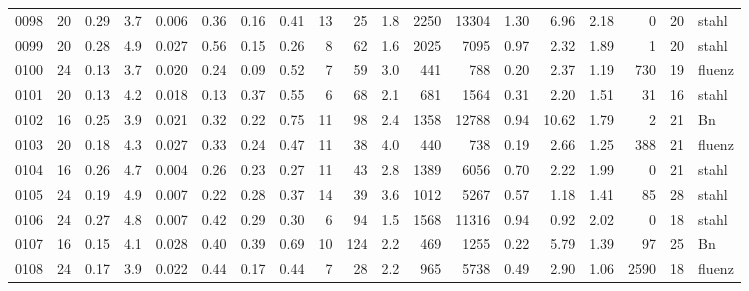 {\begin{longtable}{@{}lrrrrrrrrrrrrrrrrrl@{}}
0098 & 20 & \num{0.29} & \num{3.7} & \num{0.006} & \num{0.36} & \num{0.16} & \num{0.41} & 13 & \num{25} & \num{1.8} & \num{2250} & \num{13304} & \num{1.30} & \num{6.96} & \num{2.18} & \num{0} & \num{20} & stahl \\
0099 & 20 & \num{0.28} & \num{4.9} & \num{0.027} & \num{0.56} & \num{0.15} & \num{0.26} & 8 & \num{62} & \num{1.6} & \num{2025} & \num{7095} & \num{0.97} & \num{2.32} & \num{1.89} & \num{1} & \num{20} & stahl \\
0100 & 24 & \num{0.13} & \num{3.7} & \num{0.020} & \num{0.24} & \num{0.09} & \num{0.52} & 7 & \num{59} & \num{3.0} & \num{441} & \num{788} & \num{0.20} & \num{2.37} & \num{1.19} & \num{730} & \num{19} & fluenz \\
0101 & 20 & \num{0.13} & \num{4.2} & \num{0.018} & \num{0.13} & \num{0.37} & \num{0.55} & 6 & \num{68} & \num{2.1} & \num{681} & \num{1564} & \num{0.31} & \num{2.20} & \num{1.51} & \num{31} & \num{16} & stahl \\
0102 & 16 & \num{0.25} & \num{3.9} & \num{0.021} & \num{0.32} & \num{0.22} & \num{0.75} & 11 & \num{98} & \num{2.4} & \num{1358} & \num{12788} & \num{0.94} & \num{10.62} & \num{1.79} & \num{2} & \num{21} & Bn \\
0103 & 20 & \num{0.18} & \num{4.3} & \num{0.027} & \num{0.33} & \num{0.24} & \num{0.47} & 11 & \num{38} & \num{4.0} & \num{440} & \num{738} & \num{0.19} & \num{2.66} & \num{1.25} & \num{388} & \num{21} & fluenz \\
0104 & 16 & \num{0.26} & \num{4.7} & \num{0.004} & \num{0.26} & \num{0.23} & \num{0.27} & 11 & \num{43} & \num{2.8} & \num{1389} & \num{6056} & \num{0.70} & \num{2.22} & \num{1.99} & \num{0} & \num{21} & stahl \\
0105 & 24 & \num{0.19} & \num{4.9} & \num{0.007} & \num{0.22} & \num{0.28} & \num{0.37} & 14 & \num{39} & \num{3.6} & \num{1012} & \num{5267} & \num{0.57} & \num{1.18} & \num{1.41} & \num{85} & \num{28} & stahl \\
0106 & 24 & \num{0.27} & \num{4.8} & \num{0.007} & \num{0.42} & \num{0.29} & \num{0.30} & 6 & \num{94} & \num{1.5} & \num{1568} & \num{11316} & \num{0.94} & \num{0.92} & \num{2.02} & \num{0} & \num{18} & stahl \\
0107 & 16 & \num{0.15} & \num{4.1} & \num{0.028} & \num{0.40} & \num{0.39} & \num{0.69} & 10 & \num{124} & \num{2.2} & \num{469} & \num{1255} & \num{0.22} & \num{5.79} & \num{1.39} & \num{97} & \num{25} & Bn \\
0108 & 24 & \num{0.17} & \num{3.9} & \num{0.022} & \num{0.44} & \num{0.17} & \num{0.44} & 7 & \num{28} & \num{2.2} & \num{965} & \num{5738} & \num{0.49} & \num{2.90} & \num{1.06} & \num{2590} & \num{18} & fluenz \\

\end{longtable}}
